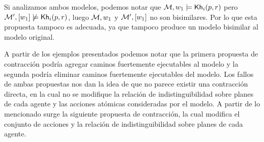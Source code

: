 

        


Si analizamos ambos modelos, podemos notar que $\mathcal{M},w_1 \models \mathsf{Kh}_i(p,r)$ pero $\mathcal{M}',[w_1] \not\models \mathsf{Kh}_i(p,r)$, luego 
$\mathcal{M},w_1$ y $\mathcal{M}',[w_1]$ no son bisimilares. Por lo que esta propuesta tampoco es adecuada, ya que tampoco produce un modelo 
bisimilar al modelo original.

A partir de los ejemplos presentados podemos notar que la primera propuesta de contracción podría agregar caminos fuertemente ejecutables al modelo 
y la segunda podría eliminar caminos fuertemente ejecutables del modelo. Los fallos de ambas propuestas nos dan la idea de que no parece 
existir una contracción directa, en la cual no se modifique la relación de indistinguibilidad sobre planes de cada agente y las acciones 
atómicas consideradas por el modelo. A partir de lo mencionado surge la siguiente propuesta de contracción, la cual modifica el 
conjunto de acciones y la relación de indistinguibilidad sobre planes de cada agente.


